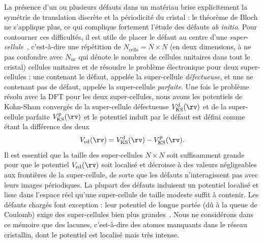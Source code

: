 La présence d'un ou plusieurs défauts dans un matériau brise explicitement la symétrie de translation discrète et la périodicité du cristal : le théorème de Bloch ne s'applique plus, ce qui complique fortement l'étude des défauts \textit{ab initio}. Pour contourner ces difficultés, il est utile de placer le défaut au centre d'une \textit{super-cellule}~\cite{freysoldtFirstprinciplesCalculationsPoint2014}, c'est-à-dire une répétition de $N_\text{cells} = N\times N$ (en deux dimensions, à ne pas confondre avec $N_\text{uc}$ qui dénote le nombres de cellules unitaires dans tout le cristal) cellules unitaires et de résoudre le problème électronique pour deux super-cellules : une contenant le défaut, appelée la super-cellule \textit{défectueuse}, et une ne contenant pas de défaut, appelée la super-cellule \textit{parfaite}. Une fois le problème résolu avec la DFT pour les deux super-cellules, nous avons les potentiels de Kohn-Sham convergés de la super-cellule défectueuse $V_\text{KS}^\text{d}(\rv)$ et de la super-cellule parfaite $V_\text{KS}^\text{p}(\rv)$ et le potentiel induit par le défaut est défini comme étant la différence des deux
\begin{equation}
    V_\text{ed}(\rv) = V_\text{KS}^\text{d}(\rv) - V_\text{KS}^\text{p}(\rv).\label{eqn:V_ed}
\end{equation}
Il est essentiel que la taille des super-cellules $N\times N$ soit suffisamment grande pour que le potentiel $V_\text{ed}(\rv)$ soit localisé et décroisse à des valeurs négligeables aux frontières de la super-cellule, de sorte que les défauts n'interagissent pas avec leurs images périodiques. La plupart des défauts induisent un potentiel localisé et lisse dans l'espace réel qu'une super-cellule de taille modeste suffit à contenir. Les défauts chargés font exception : leur potentiel de longue portée (dû à la queue de Coulomb) exige des super-cellules bien plus grandes~\cite{freysoldtFullyInitioFiniteSize2009,luFirstprinciplesIonizedimpurityScattering2021}. Nous ne considérons dans ce mémoire que des lacunes, c'est-à-dire des atomes manquants dans le réseau cristallin, dont le potentiel est localisé mais très intense.

